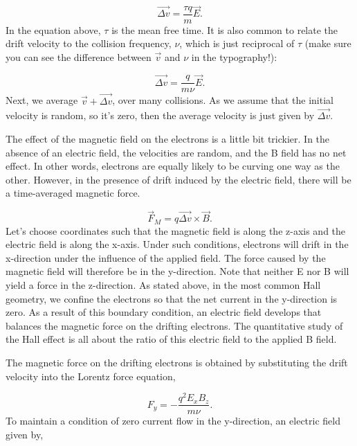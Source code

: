 \documentclass{../lab}
\begin{document}
\begin{equation}
    \vec {\Delta v}= \frac{\tau q}{m}\vec {E}.
\end{equation}
In the equation above, $ \tau$ is the mean free time. It is also common to relate the drift velocity to the collision frequency, $ \nu$, which is just reciprocal of $ \tau$ (make sure you can see the difference between $\vec{v}$ and $\nu$ in the typography!):

\begin{equation}
    \vec {\Delta v}= \frac{q}{m \nu}\vec {E}.
\end{equation}
Next, we average $ \vec {v}+\vec {\Delta v}$, over many collisions. As we assume that the initial velocity is random, so it's zero, then the average velocity is just given by $ \vec {\Delta v}$.

The effect of the magnetic field on the electrons is a little bit trickier. In the absence of an electric field, the velocities are random, and the B field has no net effect. In other words, electrons are equally likely to be curving one way as the other. However, in the presence of drift induced by the electric field, there will be a time-averaged magnetic force.

\begin{equation}
    \vec {F}_{M}=q \vec {\Delta v} \times \vec {B}.
\end{equation}
Let's choose coordinates such that the magnetic field is along the z-axis and the electric field is along the x-axis. Under such conditions, electrons will drift in the x-direction under the influence of the applied field. The force caused by the magnetic field will therefore be in the y-direction. Note that neither E nor B will yield a force in the z-direction. As stated above, in the most common Hall geometry, we confine the electrons so that the net current in the y-direction is zero. As a result of this boundary condition, an electric field develops that balances the magnetic force on the drifting electrons. The quantitative study of the Hall effect is all about the ratio of this electric field to the applied B field.

The magnetic force on the drifting electrons is obtained by substituting the drift velocity into the Lorentz force equation,

\begin{equation}
    F_y = -\frac {q^2E_xB_z} {m \nu} .
\end{equation}
To maintain a condition of zero current flow in the y-direction, an electric field given by,
\end{document}
